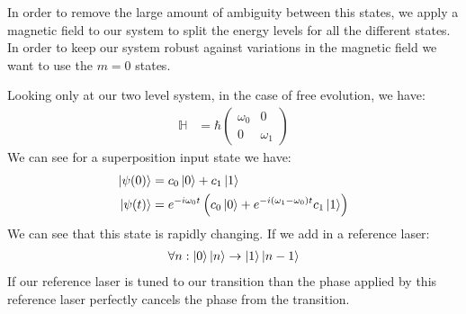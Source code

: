 In order to remove the large amount of ambiguity between this states, we apply a magnetic field to our system to split the energy levels for all the different states.
In order to keep our system robust against variations in the magnetic field we want to use the $m=0$ states.

Looking only at our two level system, in the case of free evolution, we have:
\begin{align*}
	\mathbb{H} &= \hbar \begin{pmatrix}
		\omega_0 & 0 \\
		0 & \omega_1
			    \end{pmatrix}
\end{align*}
We can see for a superposition input state we have:
\begin{align*}
	\ket{\psi(0)} &= c_0\ket{0} + c_1\ket{1} \\
	\ket{\psi(t)} &= e^{-i\omega_0 t} \left(c_0\ket{0} + e^{-i(\omega_1-\omega_0)t} c_1\ket{1}\right)
\end{align*}
We can see that this state is rapidly changing. If we add in a reference laser:
\begin{align*}
	\forall n: \ket{0}\ket{n} \to \ket{1}\ket{n-1}
\end{align*}
If our reference laser is tuned to our transition than the phase applied by this reference laser perfectly cancels the phase from the transition.
